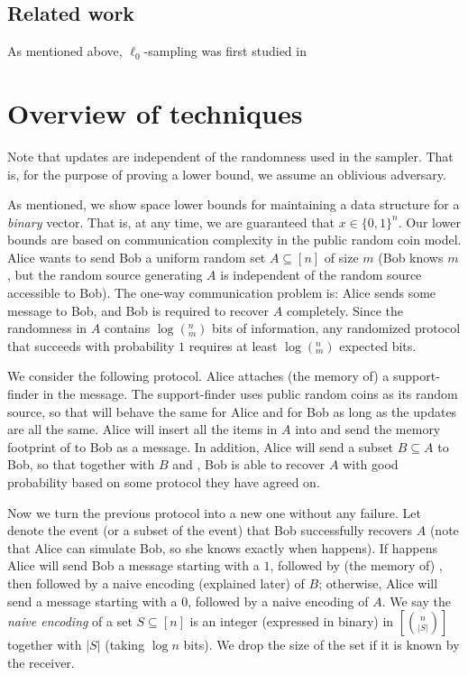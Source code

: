 \subsection{Related work}
As mentioned above, $\ell_0$-sampling was first studied in 

\section{Overview of techniques}
Note that updates are independent of the randomness used in the sampler. That is, for the purpose of proving a lower bound, we assume an oblivious adversary. 

As mentioned, we show space lower bounds for maintaining a \suppfind{} data structure for a {\em binary} vector. That is, at any time, we are guaranteed that $x\in \{0,1\}^n$. Our lower bounds are based on communication complexity in the public random coin model. Alice wants to send Bob a uniform random set $A\subseteq [n]$ of size $m$ (Bob knows $m$, but the random source generating $A$ is independent of the random source accessible to Bob). The one-way communication problem is: Alice sends some message to Bob, and Bob is required to recover $A$ completely. Since the randomness in $A$ contains $\log (^n_m)$ bits of information, any randomized protocol that succeeds with probability $1$ requires at least $\log (^n_m)$ expected bits. 

We consider the following protocol. Alice attaches (the memory of) a support-finder \samp in the message. The support-finder uses public random coins as its random source, so that \samp will behave the same for Alice and for Bob as long as the updates are all the same. Alice will insert all the items in $A$ into \samp and send the memory footprint of \samp to Bob as a message. In addition, Alice will send a subset $B\subseteq A$ to Bob, so that together with $B$ and \samp, Bob is able to recover $A$ with good probability based on some protocol they have agreed on. 
 
Now we turn the previous protocol into a new one without any failure. Let \success denote the event (or a subset of the event) that Bob successfully recovers $A$ (note that Alice can simulate Bob, so she knows exactly when \success happens). If \success happens Alice will send Bob a message starting with a $1$, followed by (the memory of) \samp, then followed by a naive encoding (explained later) of $B$; otherwise, Alice will send a message starting with a $0$, followed by a naive encoding of $A$. We say the {\em naive encoding} of a set $S\subseteq [n]$ is an integer (expressed in binary) in $[{n \choose |S|}]$ together with $|S|$ (taking $\log n$ bits). We drop the size of the set if it is known by the receiver.

